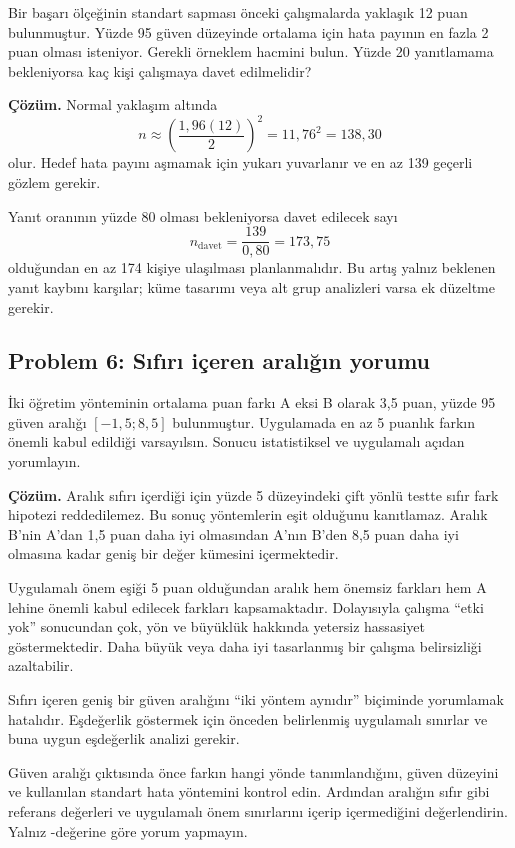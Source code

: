 Bir başarı ölçeğinin standart sapması önceki çalışmalarda yaklaşık 12 puan
bulunmuştur. Yüzde 95 güven düzeyinde ortalama için hata payının en fazla 2
puan olması isteniyor. Gerekli örneklem hacmini bulun. Yüzde 20 yanıtlamama
bekleniyorsa kaç kişi çalışmaya davet edilmelidir?

\textbf{Çözüm.} Normal yaklaşım altında
\[
n\approx\left(\frac{1{,}96(12)}{2}\right)^2
=11{,}76^2=138{,}30
\]
olur. Hedef hata payını aşmamak için yukarı yuvarlanır ve en az 139 geçerli
gözlem gerekir.

Yanıt oranının yüzde 80 olması bekleniyorsa davet edilecek sayı
\[
n_{\mathrm{davet}}=\frac{139}{0{,}80}=173{,}75
\]
olduğundan en az 174 kişiye ulaşılması planlanmalıdır. Bu artış yalnız beklenen
yanıt kaybını karşılar; küme tasarımı veya alt grup analizleri varsa ek
düzeltme gerekir.

\subsection*{Problem 6: Sıfırı içeren aralığın yorumu}

İki öğretim yönteminin ortalama puan farkı A eksi B olarak 3,5 puan, yüzde 95
güven aralığı $[-1{,}5;8{,}5]$ bulunmuştur. Uygulamada en az 5 puanlık farkın
önemli kabul edildiği varsayılsın. Sonucu istatistiksel ve uygulamalı açıdan
yorumlayın.

\textbf{Çözüm.} Aralık sıfırı içerdiği için yüzde 5 düzeyindeki çift yönlü
testte sıfır fark hipotezi reddedilemez. Bu sonuç yöntemlerin eşit olduğunu
kanıtlamaz. Aralık B'nin A'dan 1,5 puan daha iyi olmasından A'nın B'den 8,5
puan daha iyi olmasına kadar geniş bir değer kümesini içermektedir.

Uygulamalı önem eşiği 5 puan olduğundan aralık hem önemsiz farkları hem A
lehine önemli kabul edilecek farkları kapsamaktadır. Dolayısıyla çalışma
``etki yok'' sonucundan çok, yön ve büyüklük hakkında yetersiz hassasiyet
göstermektedir. Daha büyük veya daha iyi tasarlanmış bir çalışma belirsizliği
azaltabilir.

\begin{mistakebox}
Sıfırı içeren geniş bir güven aralığını ``iki yöntem aynıdır'' biçiminde
yorumlamak hatalıdır. Eşdeğerlik göstermek için önceden belirlenmiş uygulamalı
sınırlar ve buna uygun eşdeğerlik analizi gerekir.
\end{mistakebox}

\begin{outputguidebox}
Güven aralığı çıktısında önce farkın hangi yönde tanımlandığını, güven
düzeyini ve kullanılan standart hata yöntemini kontrol edin. Ardından aralığın
sıfır gibi referans değerleri ve uygulamalı önem sınırlarını içerip
içermediğini değerlendirin. Yalnız \pval-değerine göre yorum yapmayın.
\end{outputguidebox}

